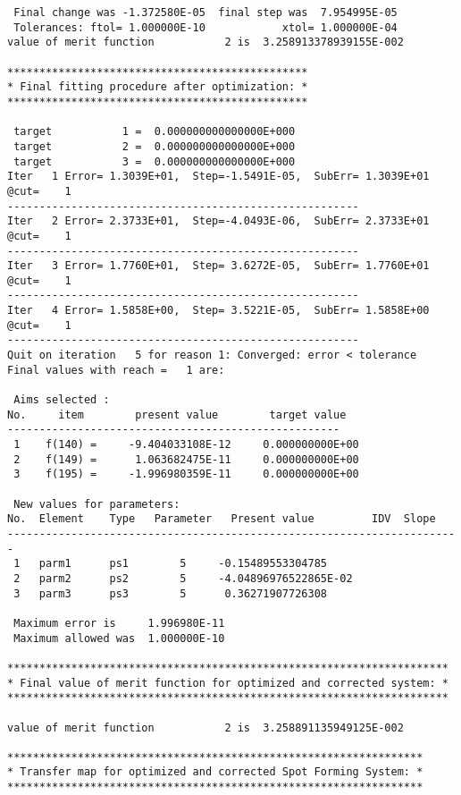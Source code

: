 \begin{footnotesize}
\begin{verbatim}
 Final change was -1.372580E-05  final step was  7.954995E-05
 Tolerances: ftol= 1.000000E-10            xtol= 1.000000E-04
value of merit function           2 is  3.258913378939155E-002

***********************************************
* Final fitting procedure after optimization: *
***********************************************

 target           1 =  0.000000000000000E+000
 target           2 =  0.000000000000000E+000
 target           3 =  0.000000000000000E+000
Iter   1 Error= 1.3039E+01,  Step=-1.5491E-05,  SubErr= 1.3039E+01 @cut=    1
-------------------------------------------------------
Iter   2 Error= 2.3733E+01,  Step=-4.0493E-06,  SubErr= 2.3733E+01 @cut=    1
-------------------------------------------------------
Iter   3 Error= 1.7760E+01,  Step= 3.6272E-05,  SubErr= 1.7760E+01 @cut=    1
-------------------------------------------------------
Iter   4 Error= 1.5858E+00,  Step= 3.5221E-05,  SubErr= 1.5858E+00 @cut=    1
-------------------------------------------------------
Quit on iteration   5 for reason 1: Converged: error < tolerance
Final values with reach =   1 are:

 Aims selected :
No.     item        present value        target value
----------------------------------------------------
 1    f(140) =     -9.404033108E-12     0.000000000E+00
 2    f(149) =      1.063682475E-11     0.000000000E+00
 3    f(195) =     -1.996980359E-11     0.000000000E+00

 New values for parameters:
No.  Element    Type   Parameter   Present value         IDV  Slope
-----------------------------------------------------------------------
 1   parm1      ps1        5     -0.15489553304785
 2   parm2      ps2        5     -4.04896976522865E-02
 3   parm3      ps3        5      0.36271907726308

 Maximum error is     1.996980E-11
 Maximum allowed was  1.000000E-10

*********************************************************************
* Final value of merit function for optimized and corrected system: *
*********************************************************************

value of merit function           2 is  3.258891135949125E-002

*****************************************************************
* Transfer map for optimized and corrected Spot Forming System: *
*****************************************************************


\end{verbatim}
\end{footnotesize}
